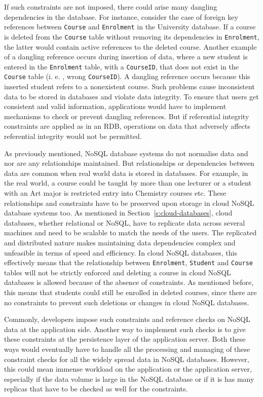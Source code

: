 If such constraints are not imposed,   there could arise many dangling
dependencies in the database.  For instance,   consider the case of foreign key
references between \texttt{Course} and \texttt{Enrolment} in the  University
database.  If a course is deleted from the \texttt{Course} table without
removing its dependencies in \texttt{Enrolment},   the latter would contain
active references to the deleted course.  Another example of a dangling
reference occurs during insertion of data,   where a new student is entered in
the \texttt{Enrolment} table,   with a \texttt{CourseID},   that does not exist
in the \texttt{Course} table (i. e. ,   wrong \texttt{CourseID}).  A dangling
reference occurs because this inserted student refers to a nonexistent course.
Such problems cause inconsistent data to be stored in databases and violate data
integrity.  To ensure that users get consistent and valid information,
applications would have to implement mechanisms to check or prevent dangling
references.  But if referential integrity constraints are applied as in an
\ac{RDB},   operations on data that  adversely affects referential integrity  
would not be permitted.

As previously mentioned,   \ac{NoSQL} database systems do not normalise data and
nor are any relationships maintained.  But relationships or dependencies between
data are common when real world data is stored in databases.  For example,   in
the real world,   a course could be taught by more than one lecturer or a
student with an Art major is restricted entry into Chemistry courses etc.  These
relationships and constraints have to be preserved upon storage in cloud
\ac{NoSQL} database systems too.  As mentioned in
Section~\ref{s:cloud-databases},   cloud databases,   whether relational or
\ac{NoSQL},   have to replicate data across several machines and need to be
scalable to match the needs of the users.  The replicated and distributed nature
makes maintaining data dependencies complex and unfeasible in terms of speed and
efficiency.  In cloud \ac{NoSQL} databases,   this effectively means that the
relationship between \texttt{Enrolment}, \texttt{Student} and \texttt{Course}
tables will not be strictly enforced and deleting a course in cloud \ac{NoSQL}
databases is allowed because of the absence of constraints.  As mentioned
before,   this means that students could still be enrolled in deleted courses,  
since there are no constraints to prevent such deletions or changes in cloud
\ac{NoSQL} databases.

Commonly,   developers impose such constraints and reference checks on
\ac{NoSQL}
data at the application side.  Another way to implement such checks is to give
these constraints at the persistence layer of the application server.  Both
these ways would eventually have to handle all the processing and managing of
these constraint checks for all the widely spread data in \ac{NoSQL} databases.
However,   this could mean immense workload on the application or the
application server,   especially if the data volume is large in the \ac{NoSQL}
database or if it is has many replicas that have to be checked as well for the
constraints.



